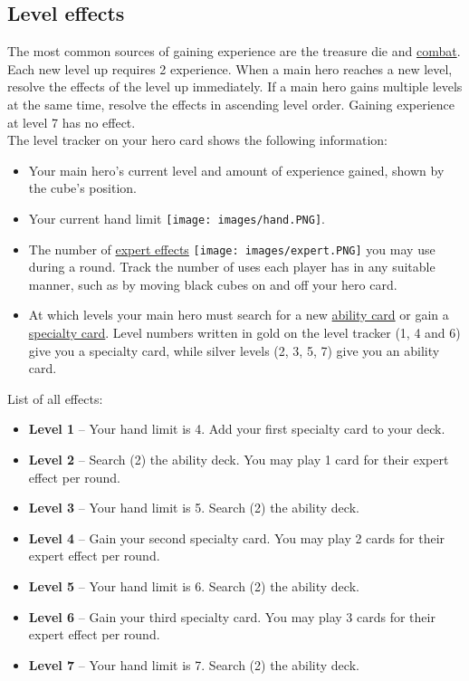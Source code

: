 \documentclass[12pt]{article}
\begin{document}
\subsection*{\hypertarget{Level}{Level effects}}
The most common sources of gaining experience are the treasure die and \hyperlink{Combatexperience}{combat}. Each new level up requires 2 experience. When a main hero reaches a new level, resolve the effects of the level up immediately. If a main hero gains multiple levels at the same time, resolve the effects in ascending level order. Gaining experience at level 7 has no effect.\\[6pt]
The level tracker on your hero card shows the following information:
\begin{itemize}
\item Your main hero’s current level and amount of experience gained, shown by the cube's position.
\item Your current hand limit \texttt{[image: images/hand.PNG]}.
\item The number of \hyperlink{Ability}{expert effects} \texttt{[image: images/expert.PNG]} you may use during a round. Track the number of uses each player has in any suitable manner, such as by moving black cubes on and off your hero card.
\item At which levels your main hero must search for a new \hyperlink{Ability}{ability card} or gain a \hyperlink{Specialty}{specialty card}. Level numbers written in gold on the level tracker (1, 4 and 6) give you a specialty card, while silver levels (2, 3, 5, 7) give you an ability card.
\end{itemize}
List of all effects:
\begin{itemize}
\item \textbf{Level 1} – Your hand limit is 4. Add your first specialty card to your deck.
\item \textbf{Level 2} – Search (2) the ability deck. You may play 1 card for their expert effect per round.
\item \textbf{Level 3} – Your hand limit is 5. Search (2) the ability deck.
\item \textbf{Level 4} – Gain your second specialty card. You may play 2 cards for their expert effect per round.
\item \textbf{Level 5} – Your hand limit is 6. Search (2) the ability deck.
\item \textbf{Level 6} – Gain your third specialty card. You may play 3 cards for their expert effect per round.
\item \textbf{Level 7} – Your hand limit is 7. Search (2) the ability deck.
\end{itemize}
\end{document}
